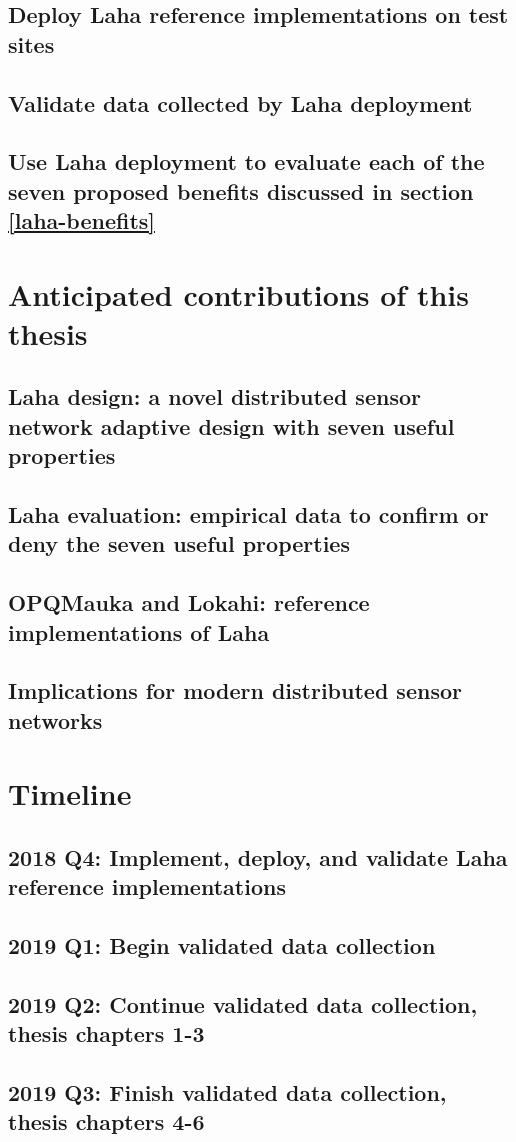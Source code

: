 \subsection{Deploy Laha reference implementations on test sites}
\subsection{Validate data collected by Laha deployment}
\subsection{Use Laha deployment to evaluate each of the seven proposed benefits discussed in section \ref{laha-benefits}}

\section{Anticipated contributions of this thesis}
\subsection{Laha design: a novel distributed sensor network adaptive design with seven useful properties}
\subsection{Laha evaluation: empirical data to confirm or deny the seven useful properties}
\subsection{OPQMauka and Lokahi: reference implementations of Laha}
\subsection{Implications for modern distributed sensor networks}

\section{Timeline}
\subsection{2018 Q4: Implement, deploy, and validate Laha reference implementations}
\subsection{2019 Q1: Begin validated data collection}
\subsection{2019 Q2: Continue validated data collection, thesis chapters 1-3}
\subsection{2019 Q3: Finish validated data collection, thesis chapters 4-6}





